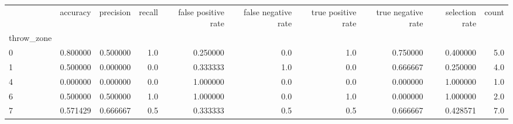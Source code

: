 \begin{tabular}{lrrrrrrrrr}
\toprule
{} &  accuracy &  precision &  recall &  false positive rate &  false negative rate &  true positive rate &  true negative rate &  selection rate &  count \\
throw\_zone &           &            &         &                      &                      &                     &                     &                 &        \\
\midrule
0          &  0.800000 &   0.500000 &     1.0 &             0.250000 &                  0.0 &                 1.0 &            0.750000 &        0.400000 &    5.0 \\
1          &  0.500000 &   0.000000 &     0.0 &             0.333333 &                  1.0 &                 0.0 &            0.666667 &        0.250000 &    4.0 \\
4          &  0.000000 &   0.000000 &     0.0 &             1.000000 &                  0.0 &                 0.0 &            0.000000 &        1.000000 &    1.0 \\
6          &  0.500000 &   0.500000 &     1.0 &             1.000000 &                  0.0 &                 1.0 &            0.000000 &        1.000000 &    2.0 \\
7          &  0.571429 &   0.666667 &     0.5 &             0.333333 &                  0.5 &                 0.5 &            0.666667 &        0.428571 &    7.0 \\
\bottomrule
\end{tabular}
